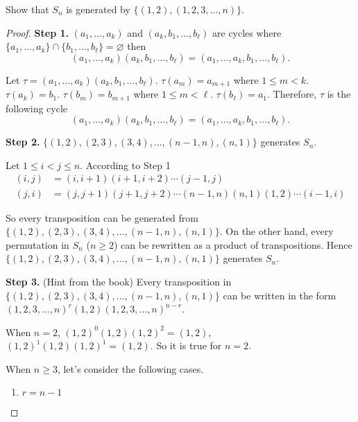 \begin{exercise}
    Show that $S_{n}$ is generated by $\{ (1,2), (1,2,3,\ldots, n) \}$.
\end{exercise}

\begin{proof}
    \textbf{Step 1.} $(a_{1}, \ldots, a_{k})$ and $(a_{k}, b_{1}, \ldots, b_{\ell})$ are cycles where $\{ a_{1}, \ldots, a_{k} \} \cap \{ b_{1}, \ldots, b_{\ell} \} = \varnothing$ then
    \[
        (a_{1}, \ldots, a_{k})(a_{k}, b_{1}, \ldots, b_{\ell}) = (a_{1},\ldots,a_{k},b_{1},\ldots,b_{\ell}).
    \]

    Let $\tau = (a_{1}, \ldots, a_{k})(a_{k}, b_{1}, \ldots, b_{\ell})$. $\tau(a_{m}) = a_{m+1}$ where $1\leq m < k$. $\tau(a_{k}) = b_{1}$. $\tau(b_{m}) = b_{m+1}$ where $1\leq m < \ell$. $\tau(b_{\ell}) = a_{1}$. Therefore, $\tau$ is the following cycle
    \[
        (a_{1}, \ldots, a_{k})(a_{k}, b_{1}, \ldots, b_{\ell}) = (a_{1},\ldots,a_{k},b_{1},\ldots,b_{\ell}).
    \]

    \textbf{Step 2.} $\{ (1,2), (2,3), (3,4), \ldots, (n-1,n), (n,1) \}$ generates $S_{n}$.

    Let $1\leq i < j\leq n$. According to Step 1
    \begin{align*}
        (i, j) & = (i,i+1)(i+1,i+2)\cdots (j-1,j)                         \\
        (j, i) & = (j,j+1)(j+1,j+2)\cdots (n-1,n)(n,1)(1,2)\cdots (i-1,i)
    \end{align*}

    So every transposition can be generated from $\{ (1,2), (2,3), (3,4), \ldots, (n-1,n), (n,1) \}$. On the other hand, every permutation in $S_{n}$ ($n\geq 2$) can be rewritten as a product of transpositions. Hence $\{ (1,2), (2,3), (3,4), \ldots, (n-1,n), (n,1) \}$ generates $S_{n}$.

    \textbf{Step 3.} (Hint from the book) Every transposition in $\{ (1,2), (2,3), (3,4), \ldots, (n-1,n), (n,1) \}$ can be written in the form ${(1,2,3,\ldots,n)}^{r}(1,2){(1,2,3,\ldots,n)}^{n-r}$.

    When $n = 2$, ${(1,2)}^{0}(1,2){(1,2)}^{2} = (1,2)$, ${(1,2)}^{1}(1,2){(1,2)}^{1} = (1,2)$. So it is true for $n = 2$.

    When $n\geq 3$, let's consider the following cases.

    \begin{enumerate}[label={\textbf{Case \arabic*.}},itemindent=1cm]
        \item $r = n-1$


\end{enumerate}
\end{proof}

